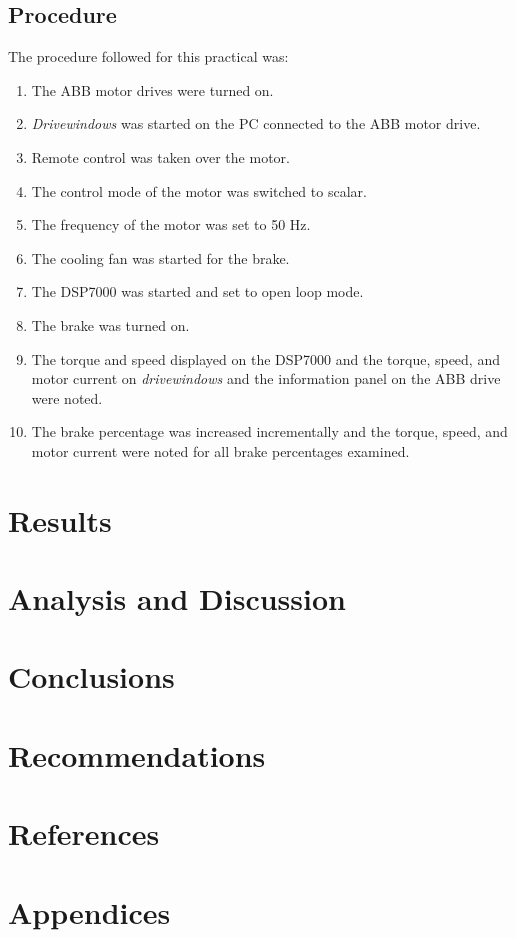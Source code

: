 \documentclass[12pt]{report}
\begin{document}
	\section{Procedure}
	The procedure followed for this practical was:
	\begin{enumerate}
		\item{The ABB motor drives were turned on.}
		\item{\textit{Drivewindows} was started on the PC connected to the ABB motor drive.}
		\item{Remote control was taken over the motor.}
		\item{The control mode of the motor was switched to scalar.}
		\item{The frequency of the motor was set to 50 Hz.}
		\item{The cooling fan was started for the brake.}
		\item{The DSP7000 was started and set to open loop mode.}
		\item{The brake was turned on.}
		\item{The torque and speed displayed on the DSP7000 and the torque, speed, and motor current on \textit{drivewindows} and the information panel on the ABB drive were noted.}
		\item{The brake percentage was increased incrementally and the torque, speed, and motor current were noted for all brake percentages examined.}
	\end{enumerate}
	
	\chapter{Results}
	
	\chapter{Analysis and Discussion}
	
	\chapter{Conclusions}
	
	\chapter{Recommendations}
	
	\chapter{References}
	
	\chapter{Appendices}
	
	
\end{document}
